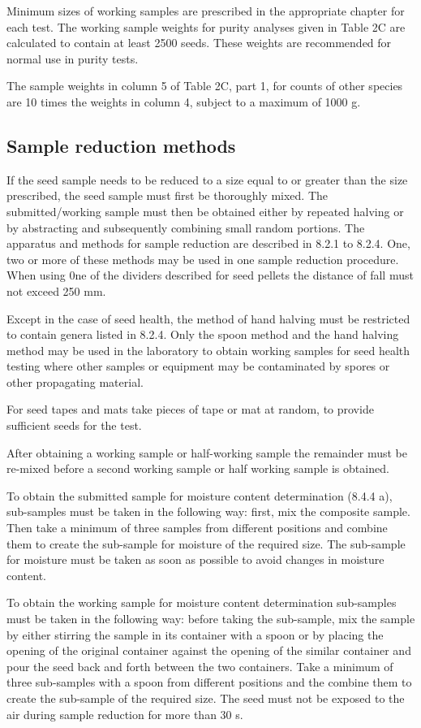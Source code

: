 \documentclass[]{book}
\begin{document}
Minimum sizes of working samples are prescribed in the appropriate
chapter for each test. The working sample weights for purity analyses
given in Table 2C are calculated to contain at least 2500 seeds. These
weights are recommended for normal use in purity tests.

The sample weights in column 5 of Table 2C, part 1, for counts of other
species are 10 times the weights in column 4, subject to a maximum of
1000 g.

\subsection{Sample reduction methods}\label{sample-reduction-methods}

If the seed sample needs to be reduced to a size equal to or greater
than the size prescribed, the seed sample must first be thoroughly
mixed. The submitted/working sample must then be obtained either by
repeated halving or by abstracting and subsequently combining small
random portions. The apparatus and methods for sample reduction are
described in 8.2.1 to 8.2.4. One, two or more of these methods may be
used in one sample reduction procedure. When using 0ne of the dividers
described for seed pellets the distance of fall must not exceed 250 mm.

Except in the case of seed health, the method of hand halving must be
restricted to contain genera listed in 8.2.4. Only the spoon method and
the hand halving method may be used in the laboratory to obtain working
samples for seed health testing where other samples or equipment may be
contaminated by spores or other propagating material.

For seed tapes and mats take pieces of tape or mat at random, to provide
sufficient seeds for the test.

After obtaining a working sample or half-working sample the remainder
must be re-mixed before a second working sample or half working sample
is obtained.

To obtain the submitted sample for moisture content determination (8.4.4
a), sub-samples must be taken in the following way: first, mix the
composite sample. Then take a minimum of three samples from different
positions and combine them to create the sub-sample for moisture of the
required size. The sub-sample for moisture must be taken as soon as
possible to avoid changes in moisture content.

To obtain the working sample for moisture content determination
sub-samples must be taken in the following way: before taking the
sub-sample, mix the sample by either stirring the sample in its
container with a spoon or by placing the opening of the original
container against the opening of the similar container and pour the seed
back and forth between the two containers. Take a minimum of three
sub-samples with a spoon from different positions and the combine them
to create the sub-sample of the required size. The seed must not be
exposed to the air during sample reduction for more than 30 s.
\end{document}
